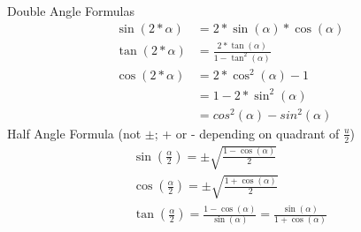 \documentclass{article}
\renewcommand{\a}{\alpha}
\begin{document}
	Double Angle Formulas
	\begin{align*}
		\sin(2 * \a) &= 2 * \sin(\a) * \cos(\a) \\
		\tan(2 * \a) &= \frac{ 2 * \tan(\a)}{1 - \tan^2(\a)} \\
		\cos(2 * \a) &= 2 * \cos^2(\a) - 1 \\
		&= 1 - 2 * \sin^2(\a) \\
		&= cos^2(\a) - sin^2(\a)
	\end{align*}
	Half Angle Formula (not $\pm$; + or - depending on quadrant of $\frac{u}{2}$)
	\begin{align*}
		\sin(\frac{\a}{2}) = \pm \sqrt{ \frac{1 - \cos(\a)}{2} } \\
		\cos(\frac{\a}{2}) = \pm \sqrt{ \frac{1 + \cos(\a)}{2} } \\
		\tan(\frac{\a}{2}) = \frac{1 - \cos(\a)}{\sin(\a)} = \frac{\sin(\a)}{1 + \cos(\a)}
	\end{align*}
\end{document}
